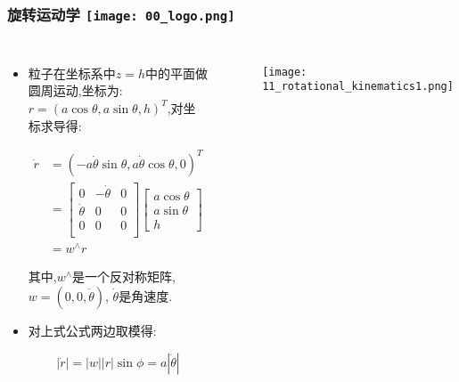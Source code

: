 
\begin{frame}
\frametitle{旋转运动学 \hfill \texttt{[image: 00\_logo.png]}}
\begin{columns}
  
	\begin{itemize}
		\item 粒子在坐标系中$z=h$中的平面做圆周运动,坐标为:$r=(a\cos\theta, a \sin \theta, h)^T$,对坐标求导得:

    \begin{equation}
      \begin{split}
        \dot{r} &= (-a \dot{\theta} \sin \theta, a\dot{\theta}\cos\theta, 0)^T \\ 
          &= \begin{bmatrix}
        0 & -\dot{\theta} & 0 \\
        \dot{\theta} & 0 & 0 \\
        0 & 0 & 0 \\
      \end{bmatrix}
      \begin{bmatrix}
        a\cos\theta \\ a\sin\theta \\ h
      \end{bmatrix} \\
      &= w^\land r
      \end{split}
    \end{equation}

    其中,$w^\land$是一个反对称矩阵,$w = (0, 0, \dot{\theta})$, $\dot{\theta}$是角速度.

    \item 对上式公式两边取模得:  
    
    \begin{equation}
      |\dot{r}| = |w| |r| \sin \phi = a|\dot{\theta}|
    \end{equation}


  \end{itemize}
  
	\begin{figure}[h]
		\texttt{[image: 11\_rotational\_kinematics1.png]}
  \end{figure}
  

\end{columns}
\end{frame}



